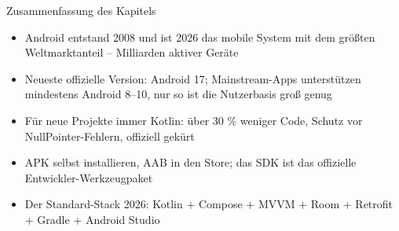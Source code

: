 \begin{tcbsummary}{Zusammenfassung des Kapitels}
\begin{itemize}
  \item Android entstand 2008 und ist 2026 das mobile System mit dem größten Weltmarktanteil – Milliarden aktiver Geräte
  \item Neueste offizielle Version: Android 17; Mainstream-Apps unterstützen mindestens Android 8–10, nur so ist die Nutzerbasis groß genug
  \item Für neue Projekte immer Kotlin: über 30 \% weniger Code, Schutz vor NullPointer-Fehlern, offiziell gekürt
  \item APK selbst installieren, AAB in den Store; das SDK ist das offizielle Entwickler-Werkzeugpaket
  \item Der Standard-Stack 2026: Kotlin + Compose + MVVM + Room + Retrofit + Gradle + Android Studio
\end{itemize}

\end{tcbsummary}
